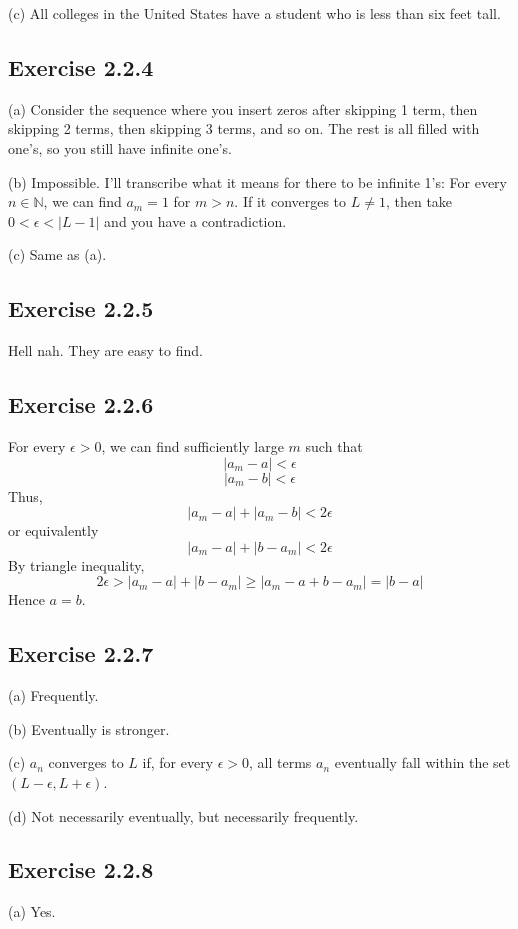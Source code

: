 \documentclass{book}
\begin{document}
\noindent
(c)
All colleges in the United States have a student who is less than six feet tall.

\subsection*{Exercise 2.2.4}
(a)
Consider the sequence where you insert zeros after skipping 1 term, then skipping 2 terms, then skipping 3 terms, and so on. The rest is all filled with one's, so you still have infinite one's.

\noindent
(b)
Impossible. I'll transcribe what it means for there to be infinite 1's: For every $n \in \mathbb{N}$, we can find $a_m = 1$ for $m > n$. If it converges to $L \neq 1$, then take $0 < \epsilon < |L - 1|$ and you have a contradiction.

\noindent
(c)
Same as (a).

\subsection*{Exercise 2.2.5}
Hell nah. They are easy to find.

\subsection*{Exercise 2.2.6}
For every $\epsilon > 0$, we can find sufficiently large $m$ such that
$$|a_m - a| < \epsilon$$
$$|a_m - b| < \epsilon$$
Thus,
$$|a_m - a| + |a_m - b| < 2\epsilon$$
or equivalently
$$|a_m - a| + |b - a_m| < 2\epsilon$$
By triangle inequality,
$$2\epsilon > |a_m - a| + |b - a_m| \geq |a_m - a + b - a_m| = |b - a|$$
Hence $a = b$.

\subsection*{Exercise 2.2.7}
(a)
Frequently.

\noindent
(b)
Eventually is stronger.

\noindent
(c)
$a_n$ converges to $L$ if, for every $\epsilon > 0$, all terms $a_n$ eventually fall within the set $(L - \epsilon, L + \epsilon)$.

\noindent
(d)
Not necessarily eventually, but necessarily frequently.

\subsection*{Exercise 2.2.8}
(a)
Yes.
\end{document}

